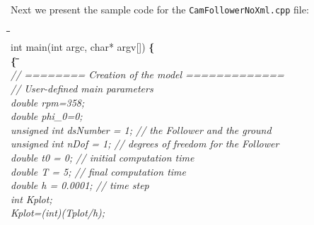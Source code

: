 Next we present the sample code for the
\verb"CamFollowerNoXml.cpp" file:
\begin{tabbing}
\hspace{1cm}\= \hspace{0.5cm}\= \hspace{1cm}\= \hspace{1cm}\= \hspace{1cm}\\
 \> \+ int main(int argc, char* argv[]) {\bf \{} \\
 \>  {\bf\{} \+ \hspace{0.5cm}\= \hspace{2cm}\= \hspace{1cm}\=\hspace{1cm}\=\hspace{1cm}\=\hspace{1cm}\=\\
 \> \em   // ======== Creation of the model =============\\
 \> \em  // User-defined main parameters\\

 \> double rpm=358; \\
 \> double phi\_0=0;\\

 \> unsigned int dsNumber = 1; \>\>\>\> \em // the Follower and the ground\\
 \> unsigned int nDof = 1;  \>\>\>\>    \em // degrees of freedom for the Follower\\
 \> double t0 = 0;            \>\>\>\>  \em   // initial computation time\\
 \> double T = 5;             \>\>\>\>  \em    // final computation time\\
 \> double h = 0.0001;   \>\>\>\>       \em // time step\\
 \> int Kplot;\\
 \> Kplot=(int)(Tplot/h);\\


\end{tabbing}
